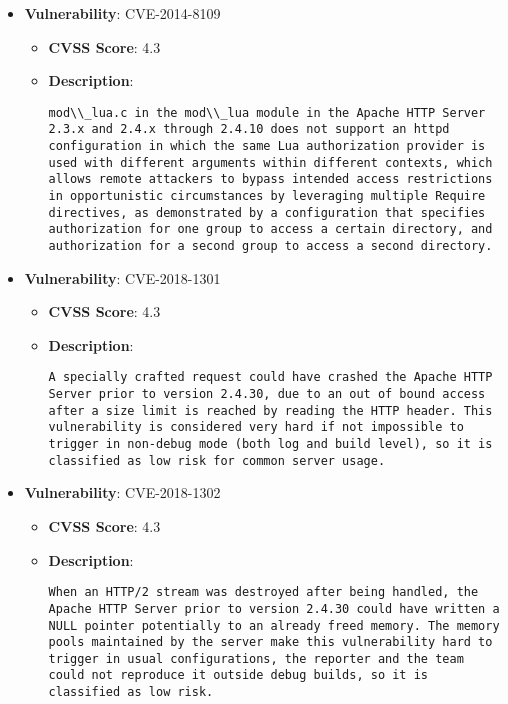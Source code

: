 \documentclass{article}
\begin{document}
\begin{itemize}
        \item \textbf{Vulnerability}: CVE-2014-8109
        \begin{itemize}
            \item \textbf{CVSS Score}:  4.3 
            \item \textbf{Description}:
            \parbox[t]{0.9\linewidth}{
                \verb|mod\\_lua.c in the mod\\_lua module in the Apache HTTP Server 2.3.x and 2.4.x through 2.4.10 does not support an httpd configuration in which the same Lua authorization provider is used with different arguments within different contexts, which allows remote attackers to bypass intended access restrictions in opportunistic circumstances by leveraging multiple Require directives, as demonstrated by a configuration that specifies authorization for one group to access a certain directory, and authorization for a second group to access a second directory.|
            }
        \end{itemize}
    
        \item \textbf{Vulnerability}: CVE-2018-1301
        \begin{itemize}
            \item \textbf{CVSS Score}:  4.3 
            \item \textbf{Description}:
            \parbox[t]{0.9\linewidth}{
                \verb|A specially crafted request could have crashed the Apache HTTP Server prior to version 2.4.30, due to an out of bound access after a size limit is reached by reading the HTTP header. This vulnerability is considered very hard if not impossible to trigger in non-debug mode (both log and build level), so it is classified as low risk for common server usage.|
            }
        \end{itemize}
    
        \item \textbf{Vulnerability}: CVE-2018-1302
        \begin{itemize}
            \item \textbf{CVSS Score}:  4.3 
            \item \textbf{Description}:
            \parbox[t]{0.9\linewidth}{
                \verb|When an HTTP/2 stream was destroyed after being handled, the Apache HTTP Server prior to version 2.4.30 could have written a NULL pointer potentially to an already freed memory. The memory pools maintained by the server make this vulnerability hard to trigger in usual configurations, the reporter and the team could not reproduce it outside debug builds, so it is classified as low risk.|
            }
        \end{itemize}
    

\end{itemize}
\end{document}
